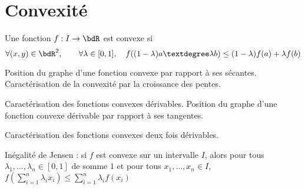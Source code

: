 \documentclass[a4paper,french,bookmarks]{article}
\begin{document}
\newpage

\section*{Convexité}

\begin{enumerate}
    \ithand Une fonction $f: I \to \bdR$ est convexe si
    \[ \forall (x, y) \in \bdR^2,\qquad \forall \lambda \in [0, 1],\quad
    f((1-\lambda)a °\lambda b) \leq (1-\lambda)f(a) + \lambda f(b)\]
    
    \ithand Position du graphe d'une fonction convexe par rapport à ses
    sécantes. Caractérisation de la convexité par la croissance des
    pentes.
    
    \ithand Caractérisation des fonctions convexes dérivables. Position
    du graphe d’une fonction convexe dérivable par rapport à ses
    tangentes.
    
    \ithand Caractérisation des fonctions convexes deux fois dérivables.
    
    \ithand Inégalité de Jensen : si $f$ est convexe sur un intervalle
    $I$, alors pour tous $\lambda_1,\dots, \lambda_n \in [0, 1]$ de
    somme $1$ et pour tous $x_1, \dots, x_n \in I$, $f\left(\sum_{i=1}^n
    \lambda_ix_i\right) \leq \sum_{i=1}^n \lambda_if(x_i)$
\end{enumerate}

\questionsdecours
\end{document}
